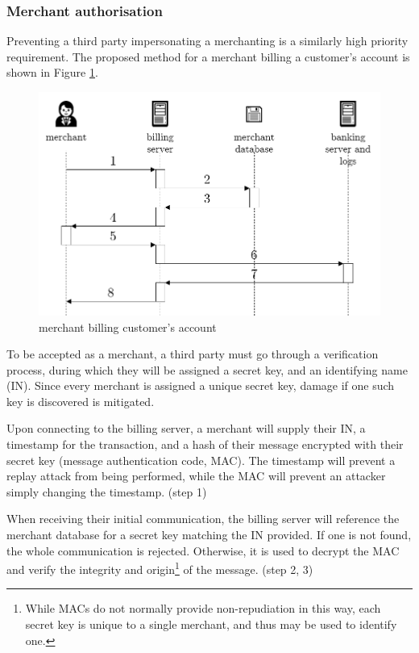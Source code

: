 \subsubsection{Merchant authorisation}

Preventing a third party impersonating a merchanting is a similarly high priority requirement.  The proposed method for a merchant billing a customer's account is shown in Figure \ref{merchantBilling}.

\begin{figure}
    \includegraphics[width=\columnwidth]{images/merchant-billing}
    \caption{merchant billing customer's account}
    \centering
    \label{merchantBilling}
\end{figure}

To be accepted as a merchant, a third party must go through a verification process, during which they will be assigned a secret key, and an identifying name (IN). Since every merchant is assigned a unique secret key, damage if one such key is discovered is mitigated.

Upon connecting to the billing server, a merchant will supply their IN, a timestamp for the transaction, and a hash of their message encrypted with their secret key (message authentication code, MAC). The timestamp will prevent a replay attack from being performed, while the MAC will prevent an attacker simply changing the timestamp. (step 1)

When receiving their initial communication, the billing server will reference the merchant database for a secret key matching the IN provided. If one is not found, the whole communication is rejected. Otherwise, it is used to decrypt the MAC and verify the integrity and origin\footnote{
    While MACs do not normally provide non-repudiation in this way, each secret key is unique to a single merchant, and thus may be used to identify one. 
} of the message. (step 2, 3)

